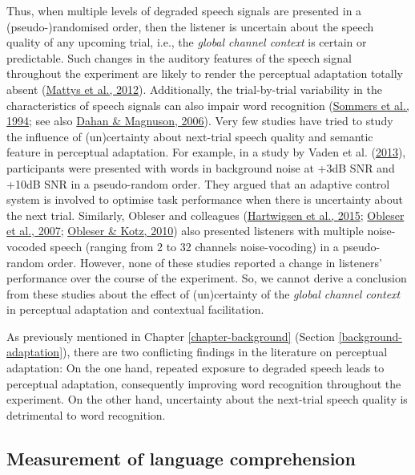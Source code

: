 \documentclass[a4paper, nobind]{templates/ociamthesis}
\begin{document}
Thus, when multiple levels of degraded speech signals are presented in a (pseudo-)randomised order, then the listener is uncertain about the speech quality of any upcoming trial, i.e., the \emph{global channel context} is certain or predictable.
Such changes in the auditory features of the speech signal throughout the experiment are likely to render the perceptual adaptation totally absent (\protect\hyperlink{ref-Mattys2012}{Mattys et al., 2012}).
Additionally, the trial-by-trial variability in the characteristics of speech signals can also impair word recognition (\protect\hyperlink{ref-Sommers1994}{Sommers et al., 1994}; see also \protect\hyperlink{ref-Dahan2006}{Dahan \& Magnuson, 2006}).
Very few studies have tried to study the influence of (un)certainty about next-trial speech quality and semantic feature in perceptual adaptation.
For example, in a study by Vaden et al. (\protect\hyperlink{ref-Vaden2013}{2013}), participants were presented with words in background noise at +3dB SNR and +10dB SNR in a pseudo-random order.
They argued that an adaptive control system is involved to optimise task performance when there is uncertainty about the next trial.
Similarly, Obleser and colleagues (\protect\hyperlink{ref-Hartwigsen2015}{Hartwigsen et al., 2015}; \protect\hyperlink{ref-Obleser2007}{Obleser et al., 2007}; \protect\hyperlink{ref-Obleser2010}{Obleser \& Kotz, 2010}) also presented listeners with multiple noise-vocoded speech (ranging from 2 to 32 channels noise-vocoding) in a pseudo-random order.
However, none of these studies reported a change in listeners' performance over the course of the experiment.
So, we cannot derive a conclusion from these studies about the effect of (un)certainty of the \emph{global channel context} in perceptual adaptation and contextual facilitation.

As previously mentioned in Chapter \ref{chapter-background} (Section \ref{background-adaptation}), there are two conflicting findings in the literature on perceptual adaptation:
On the one hand, repeated exposure to degraded speech leads to perceptual adaptation, consequently improving word recognition throughout the experiment.
On the other hand, uncertainty about the next-trial speech quality is detrimental to word recognition.

\hypertarget{chapter-6-measurement}{%
\subsection{Measurement of language comprehension}\label{chapter-6-measurement}}
\end{document}
